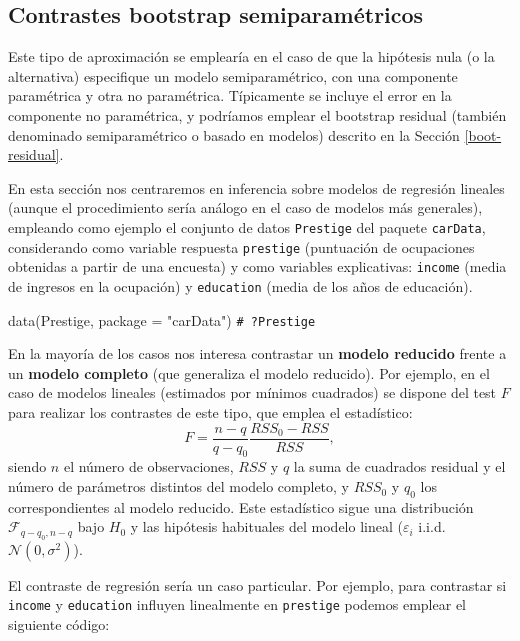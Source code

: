 \documentclass[
]{book}
\newenvironment{Shaded}{\begin{snugshade}}{\end{snugshade}}
\newcommand{\AttributeTok}[1]{\textcolor[rgb]{0.77,0.63,0.00}{#1}}
\newcommand{\CommentTok}[1]{\textcolor[rgb]{0.56,0.35,0.01}{\textit{#1}}}
\newcommand{\FunctionTok}[1]{\textcolor[rgb]{0.00,0.00,0.00}{#1}}
\newcommand{\NormalTok}[1]{#1}
\newcommand{\StringTok}[1]{\textcolor[rgb]{0.31,0.60,0.02}{#1}}
\theoremstyle{break}
\theoremstyle{nonumberplain}
\renewcommand{\CommentTok}[1]{\textcolor[rgb]{0.41,0.41,0.41}{\texttt{#1}}}
\begin{document}
\hypertarget{contrastes-semiparametricos}{%
\subsection{Contrastes bootstrap semiparamétricos}\label{contrastes-semiparametricos}}

Este tipo de aproximación se emplearía en el caso de que la hipótesis nula
(o la alternativa) especifique un modelo semiparamétrico,
con una componente paramétrica y otra no paramétrica.
Típicamente se incluye el error en la componente no paramétrica, y podríamos emplear
el bootstrap residual (también denominado semiparamétrico o basado en modelos)
descrito en la Sección \ref{boot-residual}.

En esta sección nos centraremos en inferencia sobre modelos de regresión lineales (aunque el procedimiento sería análogo en el caso de modelos más generales), empleando como ejemplo el conjunto de datos \texttt{Prestige} del paquete \texttt{carData}, considerando como variable respuesta \texttt{prestige} (puntuación de ocupaciones obtenidas a partir de una encuesta) y como variables explicativas: \texttt{income} (media de ingresos en la ocupación) y \texttt{education} (media de los años de educación).

\begin{Shaded}
\begin{Highlighting}[]
\FunctionTok{data}\NormalTok{(Prestige, }\AttributeTok{package =} \StringTok{"carData"}\NormalTok{)}
\CommentTok{\# ?Prestige}
\end{Highlighting}
\end{Shaded}

En la mayoría de los casos nos interesa contrastar un \textbf{modelo reducido}
frente a un \textbf{modelo completo} (que generaliza el modelo reducido).
Por ejemplo, en el caso de modelos lineales (estimados por mínimos cuadrados)
se dispone del test \(F\) para realizar los contrastes de este tipo,
que emplea el estadístico:
\[F=\frac{n - q}{q - q_0}\frac{RSS_0 - RSS}{RSS},\]
siendo \(n\) el número de observaciones, \(RSS\) y \(q\) la suma de cuadrados residual y
el número de parámetros distintos del modelo completo,
y \(RSS_0\) y \(q_0\) los correspondientes al modelo reducido.
Este estadístico sigue una distribución \(\mathcal{F}_{q - q_0, n - q}\)
bajo \(H_0\) y las hipótesis habituales del modelo lineal
(\(\varepsilon_i\) i.i.d. \(\mathcal{N}(0, \sigma^2)\)).

El contraste de regresión sería un caso particular. Por ejemplo,
para contrastar si \texttt{income} y \texttt{education} influyen linealmente en \texttt{prestige}
podemos emplear el siguiente código:
\end{document}
